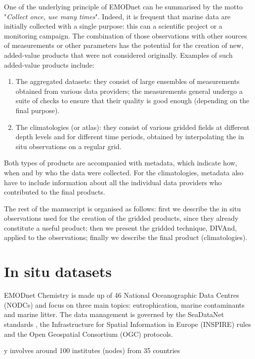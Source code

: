 \documentclass[essd, manuscript]{copernicus}
\begin{document}
One of the underlying principle of EMODnet can be summarised by the motto "\textit{Collect once, use many times}". Indeed, it is frequent that marine data are initially collected with a single purpose: this can a scientific project or a monitoring campaign. The combination of those observations with other sources of measurements or other parameters has the potential for the creation of new, added-value products that were not considered originally. Examples of such added-value products include:
\begin{enumerate}
\item The aggregated datasets: they consist of large ensembles of measurements obtained from various data providers; the measurements general undergo a suite of checks to ensure that their quality is good enough (depending on the final purpose).
\item The climatologies (or atlas): they consist of various gridded fields at different depth levels and for different time periods, obtained by interpolating the in situ observations on a regular grid.
\end{enumerate}

Both types of products are accompanied with metadata, which indicate how, when and by who the data were collected. For the climatologies, metadata also have to include information about all the individual data providers who contributed to the final products. 

The rest of the manuscript is organised as follows: first we describe the in situ observations used for the creation of the gridded products, since they already constitute a useful product; then we present the gridded technique, DIVAnd, applied to the observations; finally we describe the final product (climatologies). 


\section{In situ datasets\label{sec:insitu}}

EMODnet Chemistry is made up of 46 National Oceanographic Data Centres (NODCs) and focus on three main topics: eutrophication, marine contaminants and marine litter. The data management is governed by the SeaDataNet standards \citep{Schaap2010}, the Infrastructure for Spatial Information in Europe (INSPIRE) rules and the Open Geospatial Consortium (OGC) protocols. 

y involves around
100 institutes (nodes) from 35 countries 
\end{document}

